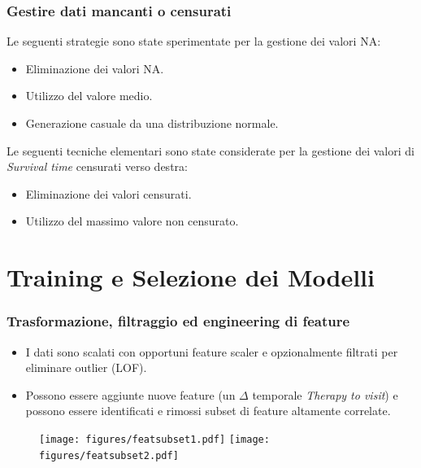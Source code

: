 \documentclass[table]{beamer}
\newcommand*{\sectionp}{\usebeamertemplate*{section p}}
\newcommand{\nologo}{\setbeamertemplate{logo}{}}
\begin{document}
\begin{frame}
\frametitle{Gestire dati mancanti o censurati}
Le seguenti strategie sono state sperimentate per la gestione dei valori NA:
\begin{itemize}
\item Eliminazione dei valori NA.
\item Utilizzo del valore medio.
\item Generazione casuale da una distribuzione normale.
\end{itemize}
\vspace{0.4cm}
Le seguenti tecniche elementari sono state considerate per la gestione dei valori di \textit{Survival time} censurati verso destra:
\begin{itemize}
\item Eliminazione dei valori censurati.
\item Utilizzo del massimo valore non censurato.
\end{itemize}
\end{frame}

\section{Training e Selezione dei Modelli}
\frame{\sectionp}

{\nologo
\begin{frame}
\frametitle{Trasformazione, filtraggio ed engineering di feature}
\begin{itemize}
\item I dati sono scalati con opportuni feature scaler e opzionalmente filtrati per eliminare outlier (LOF).
\item Possono essere aggiunte nuove feature (un $\Delta$ temporale \textit{Therapy to visit}) e possono essere identificati e rimossi subset di feature altamente correlate.
\end{itemize}
\begin{figure}[h]
  \centering
  	\texttt{[image: figures/featsubset1.pdf]}
  	\texttt{[image: figures/featsubset2.pdf]}
\end{figure}
\end{frame}}
\end{document}
